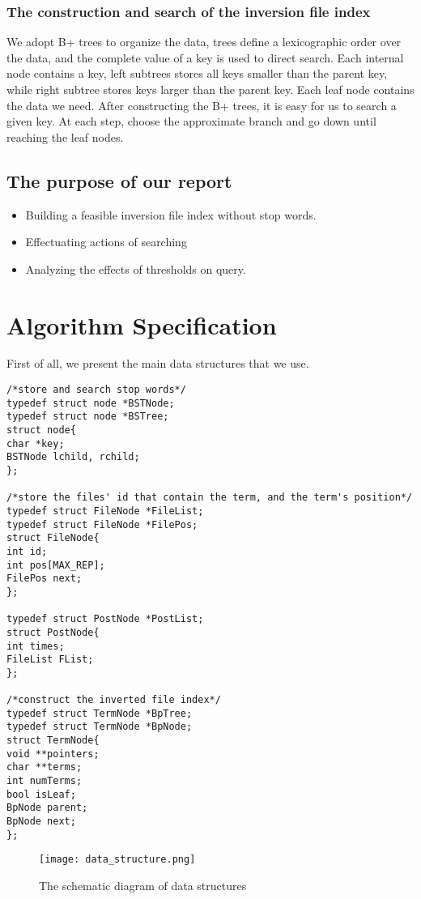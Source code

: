 \documentclass[12pt]{article}
\begin{document}
\subsubsection{The construction and search of the inversion file index}

We adopt B+ trees to organize the data, trees define a lexicographic order over the data, and the complete value of a key is used to direct search. Each internal node contains a key, left subtrees stores all keys smaller than the parent key, while right subtree stores keys larger than the parent key. Each leaf node contains the data we need. After constructing the B+ trees, it is easy for us to search a given key. At each step, choose the approximate branch and go down until reaching the leaf nodes.
\subsection{The purpose of our report}
\begin{itemize}
	\item Building a feasible inversion file index without stop words.
	\item Effectuating actions of searching 
	\item  Analyzing the effects of thresholds on query.
\end{itemize}

	\section{Algorithm Specification}
	First of all, we present the main data structures that we use. 
	\begin{lstlisting}
/*store and search stop words*/
typedef struct node *BSTNode;
typedef struct node *BSTree;
struct node{
char *key;
BSTNode lchild, rchild;
};

/*store the files' id that contain the term, and the term's position*/
typedef struct FileNode *FileList;
typedef struct FileNode *FilePos;
struct FileNode{
int id;    
int pos[MAX_REP];
FilePos next;
};

typedef struct PostNode *PostList;
struct PostNode{
int times;
FileList FList;
};

/*construct the inverted file index*/
typedef struct TermNode *BpTree;
typedef struct TermNode *BpNode;
struct TermNode{
void **pointers; 
char **terms; 
int numTerms; 
bool isLeaf; 
BpNode parent;
BpNode next;
};
\end{lstlisting}

\begin{figure}[H]
	\centering
	\texttt{[image: data\_structure.png]}
	\caption{The schematic diagram of data structures}
	\label{ds}
\end{figure}
	
\end{document}
